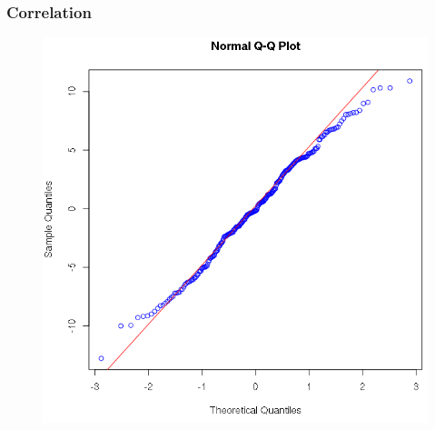 \documentclass[xcolor=dvipsnames]{beamer}
\begin{document}
\begin{frame}
  \frametitle{Correlation}
\begin{figure}[h]
\includegraphics[scale=.35]{./diagrams/bf-05.png}
\end{figure}
\end{frame}





\end{document}
